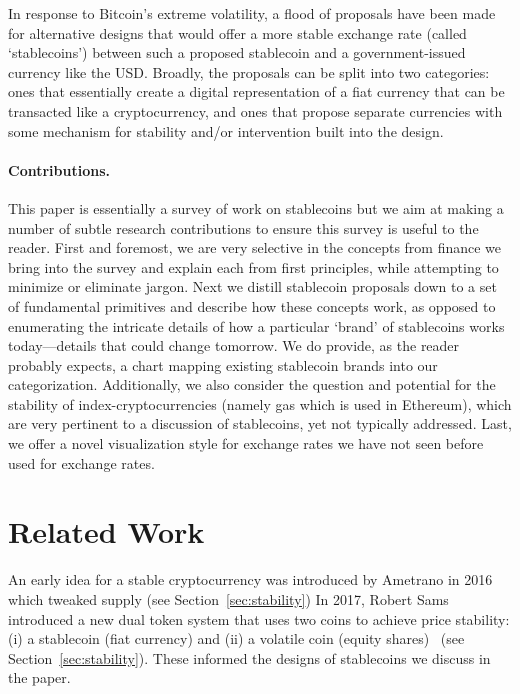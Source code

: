 In response to Bitcoin's extreme volatility, a flood of proposals have been made for alternative designs that would offer a more stable exchange rate (called `stablecoins') between such a proposed stablecoin and a government-issued currency like the USD. Broadly, the proposals can be split into two categories: ones that essentially create a digital representation of a fiat currency that can be transacted like a cryptocurrency, and ones that propose separate currencies with some mechanism for stability and/or intervention built into the design.

\paragraph{Contributions.} This paper is essentially a survey of work on stablecoins but we aim at making a number of subtle research contributions to ensure this survey is useful to the reader. First and foremost, we are very selective in the concepts from finance we bring into the survey and explain each from first principles, while attempting to minimize or eliminate jargon. Next we distill stablecoin proposals down to a set of fundamental primitives and describe how these concepts work, as opposed to enumerating the intricate details of how a particular `brand' of stablecoins works today---details that could change tomorrow. We do provide, as the reader probably expects, a chart mapping existing stablecoin brands into our categorization. Additionally, we also consider the question and potential for the stability of index-cryptocurrencies (namely gas which is used in Ethereum), which are very pertinent to a discussion of stablecoins, yet not typically addressed. Last, we offer a novel visualization style for exchange rates we have not seen before used for exchange rates.



\section{Related Work}
\label{sec:lit}

An early idea for a stable cryptocurrency was introduced by Ametrano in 2016~\cite{ametrano2016hayek} which tweaked supply (see Section~\ref{sec:stability}) In 2017, Robert Sams introduced a new dual token system that uses two coins to achieve price stability: (i) a stablecoin (\eg fiat currency) and (ii) a volatile coin (\eg equity shares)~\cite{sams2015note} (see Section~\ref{sec:stability}). These informed the designs of stablecoins we discuss in the paper.

